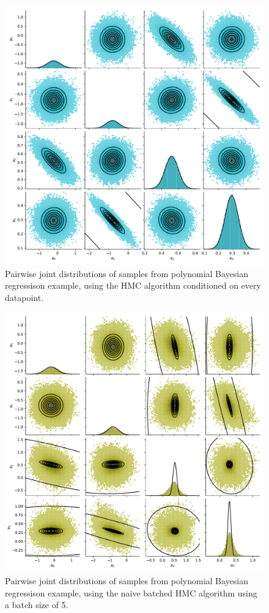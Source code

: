 \begin{figure}[htbp]
    \centering
    \includegraphics[width=\linewidth]{Figures/simulated_pairs_HMC_15.pdf}
    \caption{Pairwise joint distributions of samples from polynomial Bayesian regressison example, using the HMC algorithm conditioned on every datapoint.}
    \label{fig:pairs-hmc-15}
\end{figure}
\begin{figure}[htbp]
    \centering
    \includegraphics[width=\linewidth]{Figures/simulated_pairs_HMC_5.pdf}
    \caption{Pairwise joint distributions of samples from polynomial Bayesian regressison example, using the naive batched HMC algorithm using a batch size of 5.}
    \label{fig:pairs-hmc-5}
\end{figure}
